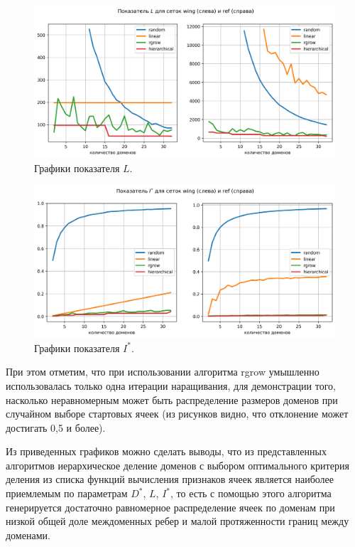 \begin{figure}[H]
	\centering
	\includegraphics[width=1.0\textwidth]{./pics/text_2_decompsurf/qual_L.png}
	\caption{Графики показателя $L$.}
	\label{fig:text_2_decompsurf_qual_L}
\end{figure}

\begin{figure}[H]
	\centering
	\includegraphics[width=1.0\textwidth]{./pics/text_2_decompsurf/qual_I_star.png}
	\caption{Графики показателя $I^{*}$.}
	\label{fig:text_2_decompsurf_qual_I_star}
\end{figure}

При этом отметим, что при использовании алгоритма rgrow умышленно использовалась только одна итерации наращивания, для демонстрации того, насколько неравномерным может быть распределение размеров доменов при случайном выборе стартовых ячеек (из рисунков видно, что отклонение может достигать 0,5 и более).

Из приведенных графиков можно сделать выводы, что из представленных алгоритмов иерархическое деление доменов с выбором оптимального критерия деления из списка функций вычисления признаков ячеек является наиболее приемлемым по параметрам $D^{*}$, $L$, $I^{*}$, то есть с помощью этого алгоритма генерируется достаточно равномерное распределение ячеек по доменам при низкой общей доле междоменных ребер и малой протяженности границ между доменами.
